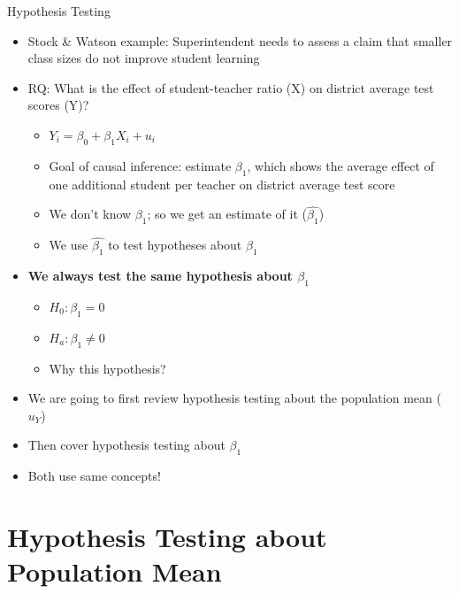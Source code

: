 \documentclass[
  8pt,
  ignorenonframetext,
  dvipsnames]{beamer}
\providecommand{\tightlist}{%
  \setlength{\itemsep}{0pt}\setlength{\parskip}{0pt}}
\renewcommand{\textbf}[1]{{\color{darkgray}\bfseries\fontfamily{Montserrat-TOsF}#1}}
\let\olditem\item
\renewcommand{\item}{%
  \olditem\vspace{4pt}
}
\begin{document}
\begin{frame}{Hypothesis Testing}
\protect\hypertarget{hypothesis-testing-1}{}

\begin{itemize}
\item
  Stock \& Watson example: Superintendent needs to assess a claim that
  smaller class sizes do not improve student learning
\item
  RQ: What is the effect of student-teacher ratio (X) on district
  average test scores (Y)?

  \begin{itemize}
  \tightlist
  \item
    \(Y_i = \beta_0 + \beta_1X_i + u_i\)
  \item
    Goal of causal inference: estimate \(\beta_1\), which shows the
    average effect of one additional student per teacher on district
    average test score
  \item
    We don't know \(\beta_1\); so we get an estimate of it
    (\(\hat{\beta_1}\))
  \item
    We use \(\hat{\beta_1}\) to test hypotheses about \(\beta_1\)
  \end{itemize}
\item
  \textbf{We always test the same hypothesis about \(\beta_1\)}

  \begin{itemize}
  \tightlist
  \item
    \(H_0: \beta_1 =0\)
  \item
    \(H_a: \beta_1 \ne 0\)
  \item
    Why this hypothesis?
  \end{itemize}
\end{itemize}

\medskip

\begin{itemize}
\tightlist
\item
  We are going to first review hypothesis testing about the population
  mean (\(u_Y\))
\item
  Then cover hypothesis testing about \(\beta_1\)
\item
  Both use same concepts!
\end{itemize}

\end{frame}

\hypertarget{hypothesis-testing-about-population-mean}{%
\section{Hypothesis Testing about Population
Mean}\label{hypothesis-testing-about-population-mean}}
\end{document}
